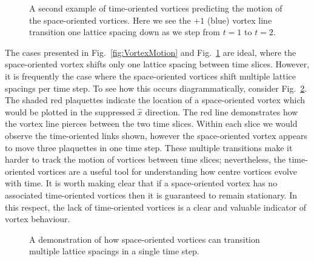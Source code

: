 \begin{figure}
\begin{subfigure}[b]{0.45\textwidth}
\end{subfigure}
\caption{\label{fig:VortexLineMotion}A second example of time-oriented vortices predicting the motion of the space-oriented vortices. Here we see the $+1$ (blue) vortex line transition one lattice spacing down as we step from $t=1$ to $t=2$.}
\end{figure}
%

The cases presented in Fig.~\ref{fig:VortexMotion} and Fig.~\ref{fig:VortexLineMotion} are ideal, where the space-oriented vortex shifts only one lattice spacing between time slices. However, it is frequently the case where the space-oriented vortices shift multiple lattice spacings per time step. To see how this occurs diagrammatically, consider Fig.~\ref{fig:ComplexStructure}. The shaded red plaquettes indicate the location of a space-oriented vortex which would be plotted in the suppressed $\hat{x}$ direction. The red line demonstrates how the vortex line pierces between the two time slices. Within each slice we would observe the time-oriented links shown, however the space-oriented vortex appears to move three plaquettes in one time step. These multiple transitions make it harder to track the motion of vortices between time slices; nevertheless, the time-oriented vortices are a useful tool for understanding how centre vortices evolve with time. It is worth making clear that if a space-oriented vortex has no associated time-oriented vortices then it is guaranteed to remain stationary. In this respect, the lack of time-oriented vortices is a clear and valuable indicator of vortex behaviour.
%
\begin{figure}
\centering

\caption{\label{fig:ComplexStructure}A demonstration of how space-oriented vortices can transition multiple lattice spacings in a single time step.}
\end{figure}

